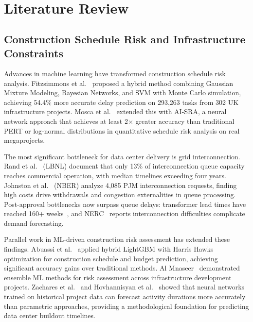 \documentclass[5p,12pt]{elsarticle}
\begin{document}
\section{Literature Review}
\label{sec:litreview}

\subsection{Construction Schedule Risk and Infrastructure Constraints}

Advances in machine learning have transformed construction schedule risk analysis. Fitzsimmons et al.~\cite{Fitzsimmons2022Construction} proposed a hybrid method combining Gaussian Mixture Modeling, Bayesian Networks, and SVM with Monte Carlo simulation, achieving 54.4\% more accurate delay prediction on 293,263 tasks from 302 UK infrastructure projects. Mosca et al.~\cite{Mosca2026AI} extended this with AI-SRA, a neural network approach that achieves at least 2$\times$ greater accuracy than traditional PERT or log-normal distributions in quantitative schedule risk analysis on real megaprojects.

The most significant bottleneck for data center delivery is grid interconnection. Rand et al.~\cite{Rand2025QueuedUp} (LBNL) document that only 13\% of interconnection queue capacity reaches commercial operation, with median timelines exceeding four years. Johnston et al.~\cite{Johnston2023Empirical} (NBER) analyze 4,085 PJM interconnection requests, finding high costs drive withdrawals and congestion externalities in queue processing. Post-approval bottlenecks now surpass queue delays: transformer lead times have reached 160+ weeks~\cite{DCKnowlege2026Delays}, and NERC~\cite{NERC2026Interconnection} reports interconnection difficulties complicate demand forecasting.

Parallel work in ML-driven construction risk assessment has extended these findings. Abuassi et al.~\cite{Abuassi2025LightGBM} applied hybrid LightGBM with Harris Hawks optimization for construction schedule and budget prediction, achieving significant accuracy gains over traditional methods. Al Mnaseer~\cite{AlMnaseer2026Ensemble} demonstrated ensemble ML methods for risk assessment across infrastructure development projects. Zachares et al.~\cite{Zachares2022Forecasting} and Hovhannisyan et al.~\cite{Hovhannisyan2023DataDriven} showed that neural networks trained on historical project data can forecast activity durations more accurately than parametric approaches, providing a methodological foundation for predicting data center buildout timelines.
\end{document}
